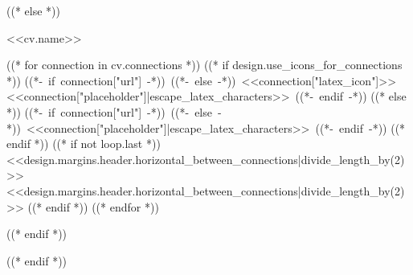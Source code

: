 ((* else *))
\begin{header}
    \fontsize{<<design.header_font_size>>}{<<design.header_font_size>>}\selectfont <<cv.name>>

    \vspace{<<design.margins.header.vertical_between_name_and_connections>>}

    \normalsize
    ((* for connection in cv.connections *))
        ((* if design.use_icons_for_connections *))
    \mbox{((*- if connection["url"] -*))
        ((*- else -*))
        {\footnotesize<<connection["latex_icon"]>>}\hspace*{0.13cm}<<connection["placeholder"]|escape_latex_characters>>
        ((*- endif -*))}%
        ((* else *))
    \mbox{((*- if connection["url"] -*))
        ((*- else -*))
        <<connection["placeholder"]|escape_latex_characters>>
        ((*- endif -*))}%
        ((* endif *))
        ((* if not loop.last *))
    \kern <<design.margins.header.horizontal_between_connections|divide_length_by(2)>>%
    \AND%
    \kern <<design.margins.header.horizontal_between_connections|divide_length_by(2)>>%
        ((* endif *))
    ((* endfor *))
\end{header}
((* endif *))

\vspace{<<design.margins.header.bottom>> - <<design.margins.section_title.top>>}
((* endif *))